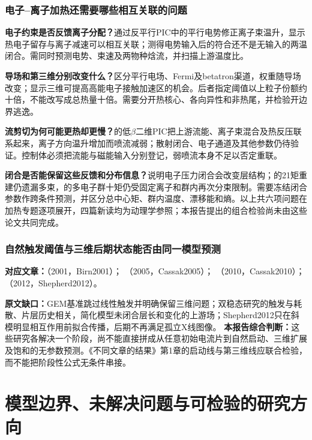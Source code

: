 \documentclass[UTF8,a4paper,11pt,openany,fontset=fandol]{ctexbook}
\begin{document}
\subsection{电子--离子加热还需要哪些相互关联的问题}
\textbf{电子约束是否反馈离子分配？}\citet{Haggerty2015Partition}通过反平行PIC中的平行电势修正离子束温升，显示热电子留存与离子减速可以相互关联；测得电势输入后的符合还不是无输入的两温闭合。需同时预测电势、束速及两物种焓流，并扫描上游温度比。

\textbf{导场和第三维分别改变什么？}\citet{Dahlin2014Mechanisms}区分平行电场、Fermi及betatron渠道，权重随导场改变；\citet{Dahlin2015ThreeD}显示三维可提高高能电子接触加速区的机会。后者指定阈值以上粒子份额约十倍，不能改写成总热量十倍。需要分开热核心、各向异性和非热尾，并检验开边界逃逸。

\textbf{流剪切为何可能更热却更慢？}\citet{F627}的低$\beta$二维PIC把上游流能、离子束混合及热反压联系起来，离子方向温升增加而喷流减弱；散射闭合、电子通道及其他参数仍待验证。控制体必须把流能与磁能输入分别登记，弱喷流本身不足以否定重联。

\textbf{闭合是否能保留这些反馈和分布信息？}\citet{F611}说明电子压力闭合会改变层结构；\citet{E553}的21矩重建仍遗漏多束，\citet{F635}的多电子群十矩仍受固定离子和群内再次分束限制。需要冻结闭合参数作跨条件预测，并区分总中心矩、群内温度、漂移能和熵。以上共六项问题在加热专题逐项展开，四篇新读均为动理学参照；本报告提出的组合检验尚未由这些论文共同完成。

\subsection{自然触发阈值与三维后期状态能否由同一模型预测}
\textbf{对应文章：}\citet{Birn2001}（2001，Birn2001）；
\citet{Cassak2005}（2005，Cassak2005）；
\citet{Cassak2010}（2010，Cassak2010）；
\citet{Shepherd2012}（2012，Shepherd2012）。

\textbf{原文缺口：}GEM基准跳过线性触发并明确保留三维问题；双稳态研究的触发与耗散、片层历史相关，简化模型未闭合层长和变化的上游场；Shepherd2012只在斜模明显相互作用前拟合传播，后期不再满足孤立X线图像。
\textbf{本报告综合判断：}这些研究各解决一个阶段，尚不能直接拼成从任意初始电流片到自然启动、三维扩展及饱和的无参数预测。《不同文章的结果》第1章的启动线与第三维线应联合检验，而不能把阶段性公式无条件串接。



\chapter{模型边界、未解决问题与可检验的研究方向}
\end{document}
